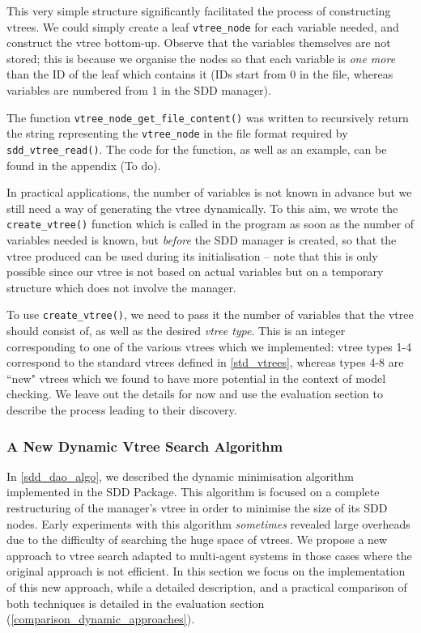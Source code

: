 \documentclass[11pt]{article}
\begin{document}
This very simple structure significantly facilitated the process of constructing vtrees. We could simply create a leaf \texttt{vtree\_node} for each variable needed, and construct the vtree bottom-up. Observe that the variables themselves are not stored; this is because we organise the nodes so that each variable is \textit{one more} than the ID of the leaf which contains it (IDs start from 0 in the file, whereas variables are numbered from 1 in the SDD manager).

 The function \texttt{vtree\_node\_get\_file\_content()} was written to recursively return the string representing the \texttt{vtree\_node} in the file format required by \texttt{sdd\_vtree\_read()}. The code for the function, as well as an example, can be found in the appendix (To do). 

In practical applications, the number of variables is not known in advance but we still need a way of generating the vtree dynamically. To this aim, we wrote the \texttt{create\_vtree()} function which is called in the program as soon as the number of variables needed is known, but \textit{before} the SDD manager is created, so that the vtree produced can be used during its initialisation -- note that this is only possible since our vtree is not based on actual variables but on a temporary structure which does not involve the manager. 

To use \texttt{create\_vtree()}, we need to pass it the number of variables that the vtree should consist of, as well as the desired \textit{vtree type}. This is an integer corresponding to one of the various vtrees which we implemented: vtree types 1-4 correspond to the standard vtrees defined in \ref{std_vtrees}, whereas types 4-8 are ``new" vtrees which we found to have more potential in the context of model checking. We leave out the details for now and use the evaluation section to describe the process leading to their discovery. 

\subsubsection{A New Dynamic Vtree Search Algorithm}

In \ref{sdd_dao_algo}, we described the dynamic minimisation algorithm implemented in the SDD Package. This algorithm is focused on a complete restructuring of the manager's vtree in order to minimise the size of its SDD nodes.
Early experiments with this algorithm \textit{sometimes }revealed large overheads due to the difficulty of searching the huge space of vtrees. We propose a new approach to vtree search adapted to multi-agent systems in those cases where the original approach is not efficient. In this section we focus on the implementation of this new approach, while a detailed description, and a practical comparison of both techniques is detailed in the evaluation section (\ref{comparison_dynamic_approaches}).
\end{document}
